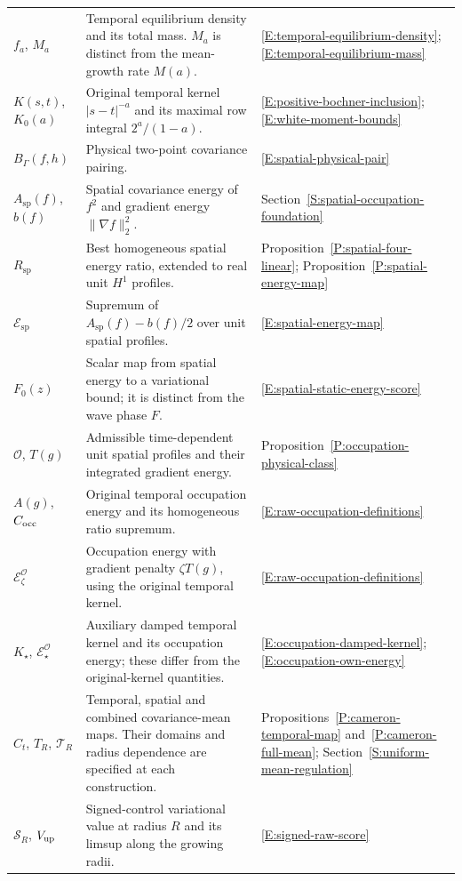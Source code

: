 \begin{longtable}{@{}>{\raggedright\arraybackslash}p{}
  >{\raggedright\arraybackslash}p{}
  >{\raggedright\arraybackslash}p{}@{}}
  $f_a$, $M_a$ &
  Temporal equilibrium density and its total mass. $M_a$ is distinct from the
  mean-growth rate $M(a)$. &
  \eqref{E:temporal-equilibrium-density}; \eqref{E:temporal-equilibrium-mass}
  \\[5pt]
  $K(s,t)$, $K_0(a)$ &
  Original temporal kernel $|s-t|^{-a}$ and its maximal row integral $2^a/(1 -
  a)$. &
  \eqref{E:positive-bochner-inclusion}; \eqref{E:white-moment-bounds} \\[5pt]
  $B_\Gamma(f,h)$ &
  Physical two-point covariance pairing. &
  \eqref{E:spatial-physical-pair} \\[5pt]
  $A_{\mathrm{sp}}(f)$, $b(f)$ &
  Spatial covariance energy of $f^2$ and gradient energy $\|\nabla f\|_2^2$. &
  Section~\ref{S:spatial-occupation-foundation} \\[5pt]
  $R_{\mathrm{sp}}$ &
  Best homogeneous spatial energy ratio, extended to real unit $H^1$ profiles. &
  Proposition~\ref{P:spatial-four-linear};
  Proposition~\ref{P:spatial-energy-map} \\[5pt]
  $\mathcal{E}_{\mathrm{sp}}$ &
  Supremum of $A_{\mathrm{sp}}(f) - b(f)/2$ over unit spatial profiles. &
  \eqref{E:spatial-energy-map} \\[5pt]
  $F_0(z)$ &
  Scalar map from spatial energy to a variational bound; it is distinct from the
  wave phase $F$. &
  \eqref{E:spatial-static-energy-score} \\[5pt]
  $\mathcal{O}$, $T(g)$ &
  Admissible time-dependent unit spatial profiles and their integrated gradient
  energy. &
  Proposition~\ref{P:occupation-physical-class} \\[5pt]
  $A(g)$, $C_{\rm occ}$ &
  Original temporal occupation energy and its homogeneous ratio supremum. &
  \eqref{E:raw-occupation-definitions} \\[5pt]
  $\mathcal{E}_\zeta^{\mathcal{O}}$ &
  Occupation energy with gradient penalty $\zeta T(g)$, using the original
  temporal kernel. &
  \eqref{E:raw-occupation-definitions} \\[5pt]
  $K_\star$, $\mathcal{E}_\star^{\mathcal{O}}$ &
  Auxiliary damped temporal kernel and its occupation energy; these differ from
  the original-kernel quantities. &
  \eqref{E:occupation-damped-kernel}; \eqref{E:occupation-own-energy} \\[5pt]
  $C_t$, $T_R$, $\mathcal{T}_R$ &
  Temporal, spatial and combined covariance-mean maps. Their domains and radius
  dependence are specified at each construction. &
  Propositions~\ref{P:cameron-temporal-map} and~\ref{P:cameron-full-mean};
  Section~\ref{S:uniform-mean-regulation} \\[5pt]
  $\mathcal{S}_R$, $V_{\rm up}$ &
  Signed-control variational value at radius $R$ and its limsup along the
  growing radii. &
  \eqref{E:signed-raw-score} \\[5pt]
\end{longtable}

